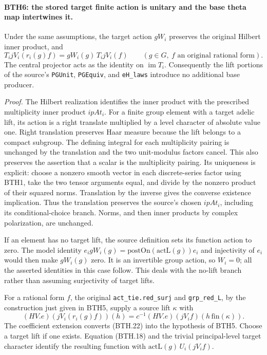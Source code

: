 \paragraph{BTH6: the stored target finite action is unitary and the base theta map intertwines it.}
\label{claim:BTH6}
Under the same assumptions, the target action \(gW_i\)
preserves the original Hilbert inner product, and
\[
 T_i jV_i(r_i(g)f)=gW_i(g)\,T_i jV_i(f)
       \qquad(g\in G,\ f\text{ an original rational form}).      \tag{BTH.21}
\]
The central projector acts as the identity on
\(\operatorname{im}T_i\).  Consequently the lift portions of
the source's \texttt{PGUnit}, \texttt{PGEquiv}, and
\texttt{e\allowbreak H\_\allowbreak laws} introduce no additional base producer.

\emph{Proof.}
The Hilbert realization identifies the inner product with
the prescribed multiplicity inner product \(ipAt_i\).
For a finite group element with a target adelic lift, its
action is a right translate multiplied by a level character
of absolute value one.  Right translation preserves Haar
measure because the lift belongs to a compact subgroup.
The defining integral for each multiplicity pairing is
unchanged by the translation and the two unit-modulus
factors cancel.  This also preserves the assertion that a
scalar is the multiplicity pairing.  Its uniqueness is
explicit: choose a nonzero smooth vector in each discrete-series
factor using BTH1, take the two tensor arguments equal, and
divide by the nonzero product of their squared norms.
Translation by the inverse gives the converse existence
implication.  Thus the translation preserves the source's
chosen \(ipAt_i\), including its conditional-choice branch.
Norms, and then inner
products by complex polarization, are unchanged.

If an element has no target lift, the source definition
sets its function action to zero.  The model identity
\(e_i gW_i(g)=\mathrm{postOn}(\mathrm{actL}(g))e_i\)
and injectivity of \(e_i\) would then make \(gW_i(g)\)
zero.  It is an invertible group action, so \(W_i=0\);
all the asserted identities in this case follow.
This deals with the no-lift branch rather than assuming
surjectivity of target lifts.

For a rational form \(f\), the original
\texttt{act\_\allowbreak tie.red\_\allowbreak surj} and \texttt{grp\_\allowbreak red\_\allowbreak L},
by the construction just given in BTH5, supply a source lift \(\kappa\)
with
\[
 (HV.e)(jV_i(r_i(g)f))(h)
 =c^{-1}(HV.e)(jV_i f)(h\,\mathrm{fin}(\kappa)).
 \tag{BTH.22}
\]
The coefficient extension converts (BTH.22) into the
hypothesis of BTH5.  Choose a target lift if one exists.
Equation (BTH.18) and the trivial principal-level target
character identify the resulting function with
\(\mathrm{actL}(g)\,U_i(jV_i f)\).

